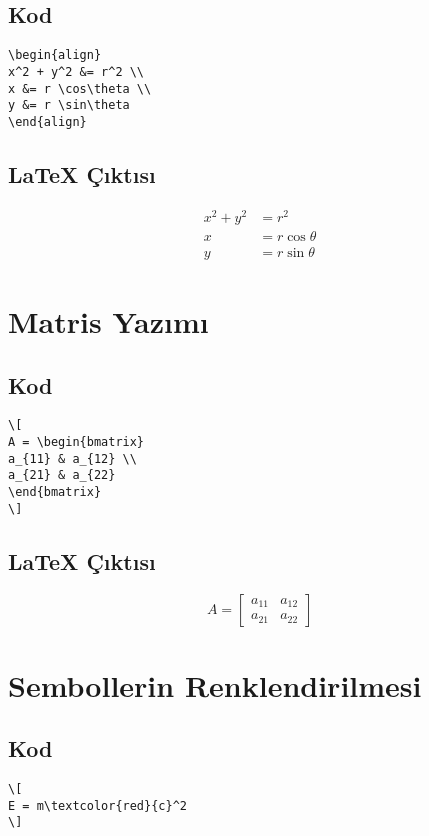 \documentclass[a4paper,12pt]{article}
\begin{document}
\subsection{Kod}
\begin{verbatim}
\begin{align}
x^2 + y^2 &= r^2 \\
x &= r \cos\theta \\
y &= r \sin\theta
\end{align}
\end{verbatim}

\subsection{\LaTeX{} Çıktısı}
\begin{align}
x^2 + y^2 &= r^2 \\
x &= r \cos\theta \\
y &= r \sin\theta
\end{align}

\section{Matris Yazımı}
\subsection{Kod}
\begin{verbatim}
\[
A = \begin{bmatrix}
a_{11} & a_{12} \\
a_{21} & a_{22}
\end{bmatrix}
\]
\end{verbatim}

\subsection{\LaTeX{} Çıktısı}
\[
A = \begin{bmatrix}
a_{11} & a_{12} \\
a_{21} & a_{22}
\end{bmatrix}
\]

\section{Sembollerin Renklendirilmesi}
\subsection{Kod}
\begin{verbatim}
\[
E = m\textcolor{red}{c}^2
\]
\end{verbatim}
\end{document}

